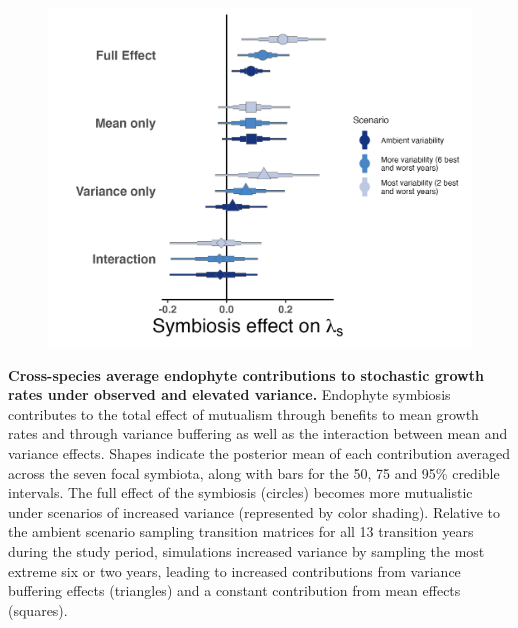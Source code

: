 \documentclass[12pt]{article}
\begin{document}
\begin{figure}
	\centering
	\includegraphics[width=.8\linewidth]{StochDemo_fig4.png}
\end{figure}
 \textbf{Cross-species average endophyte contributions to stochastic growth rates under observed and elevated variance.} Endophyte symbiosis contributes to the total effect of mutualism through benefits to mean growth rates and through variance buffering as well as the interaction between mean and variance effects. Shapes indicate the posterior mean of each contribution averaged across the seven focal symbiota, along with bars for the 50, 75 and 95\% credible intervals.  The full effect of the symbiosis (circles) becomes more mutualistic under scenarios of increased variance (represented by color shading). Relative to the ambient scenario sampling transition matrices for all 13 transition years during the study period, simulations increased variance by sampling the most extreme six or two years, leading to increased contributions from variance buffering effects (triangles) and a constant contribution from mean effects (squares).
\newpage
\end{document}
